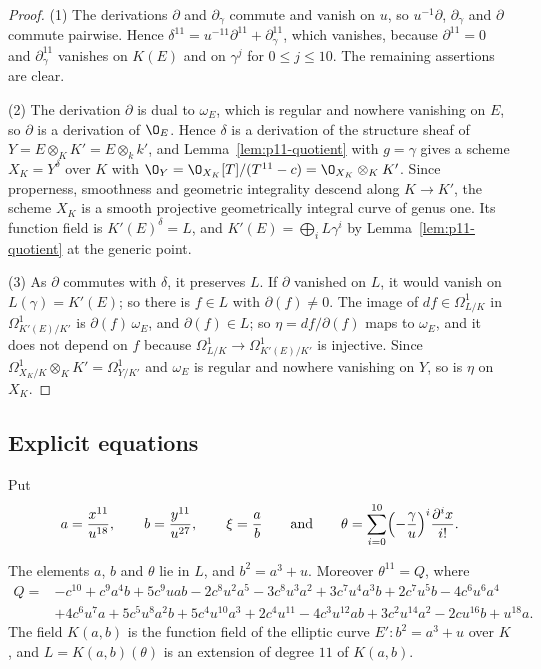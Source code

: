 \begin{proof}
(1) The derivations $\partial$ and $\partial_\gamma$ commute and vanish on $u$, so $u^{-1}\partial$, $\partial_\gamma$ and $\partial$ commute pairwise.
Hence $\delta^{11} = u^{-11}\partial^{11}+\partial_\gamma^{11}$, which vanishes, because $\partial^{11} = 0$ and $\partial_\gamma^{11}$ vanishes on $K(E)$ and on $\gamma^j$ for $0\leq j\leq 10$.
The remaining assertions are clear.

(2) The derivation $\partial$ is dual to $\omega_E$, which is regular and nowhere vanishing on $E$, so $\partial$ is a derivation of $\O_E$.
Hence $\delta$ is a derivation of the structure sheaf of $Y = E\otimes_KK' = E\otimes_kk'$, and Lemma~\ref{lem:p11-quotient} with $g = \gamma$ gives a scheme $X_K = Y^\delta$ over $K$ with $\O_Y = \O_{X_K}[T]/(T^{11}-c) = \O_{X_K}\otimes_KK'$.
Since properness, smoothness and geometric integrality descend along $K\to K'$, the scheme $X_K$ is a smooth projective geometrically integral curve of genus one.
Its function field is $K'(E)^\delta = L$, and $K'(E) = \bigoplus_iL\gamma^i$ by Lemma~\ref{lem:p11-quotient} at the generic point.

(3) As $\partial$ commutes with $\delta$, it preserves $L$.
If $\partial$ vanished on $L$, it would vanish on $L(\gamma) = K'(E)$; so there is $f\in L$ with $\partial(f)\neq 0$.
The image of $df\in\Omega^1_{L/K}$ in $\Omega^1_{K'(E)/K'}$ is $\partial(f)\,\omega_E$, and $\partial(f)\in L$; so $\eta = df/\partial(f)$ maps to $\omega_E$, and it does not depend on $f$ because $\Omega^1_{L/K}\to\Omega^1_{K'(E)/K'}$ is injective.
Since $\Omega^1_{X_K/K}\otimes_KK' = \Omega^1_{Y/K'}$ and $\omega_E$ is regular and nowhere vanishing on $Y$, so is $\eta$ on $X_K$.
\end{proof}

\subsection{Explicit equations}

Put
\[
  a = \frac{x^{11}}{u^{18}},\qquad b = \frac{y^{11}}{u^{27}},\qquad\xi = \frac ab\qquad\text{and}\qquad\theta = \sum_{i=0}^{10}\Bigl(-\frac{\gamma}{u}\Bigr)^i\frac{\partial^ix}{i!}.
\]

\begin{lemma}\label{lem:p11-equations}
The elements $a$, $b$ and $\theta$ lie in $L$, and $b^2 = a^3+u$.
Moreover $\theta^{11} = Q$, where
\begin{equation}\label{eq:p11-Q}
\begin{aligned}
  Q ={}&-c^{10}+c^9a^4b+5c^9uab-2c^8u^2a^5-3c^8u^3a^2+3c^7u^4a^3b+2c^7u^5b-4c^6u^6a^4\\
  &+4c^6u^7a+5c^5u^8a^2b+5c^4u^{10}a^3+2c^4u^{11}-4c^3u^{12}ab+3c^2u^{14}a^2-2cu^{16}b+u^{18}a.
\end{aligned}
\end{equation}
The field $K(a,b)$ is the function field of the elliptic curve $E'\colon b^2 = a^3+u$ over $K$, and $L = K(a,b)(\theta)$ is an extension of degree $11$ of $K(a,b)$.
\end{lemma}

